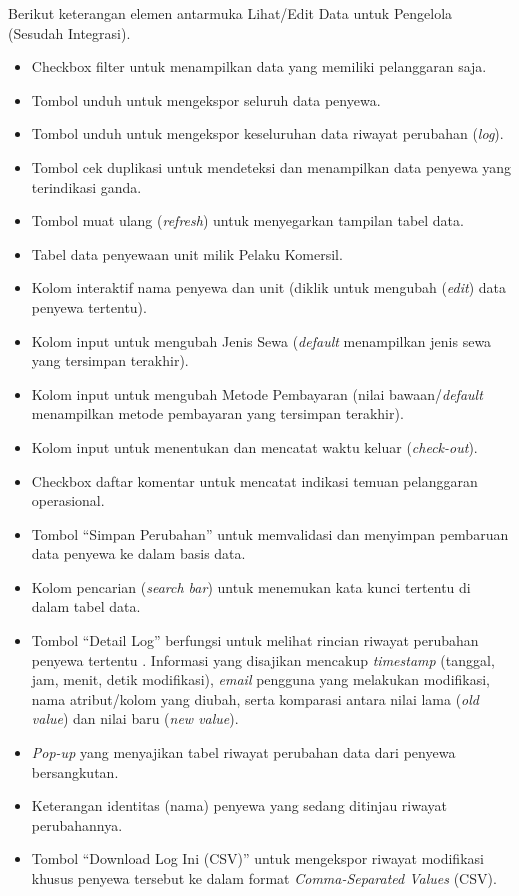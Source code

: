 \begin{itemize}
    Berikut keterangan elemen antarmuka Lihat/Edit Data untuk Pengelola (Sesudah Integrasi).
    \begin{itemize}
        \item[\textbf{A.}] {Checkbox} filter untuk menampilkan data yang memiliki pelanggaran saja.
        \item[\textbf{B.}] Tombol unduh untuk mengekspor seluruh data penyewa.
        \item[\textbf{C.}] Tombol unduh untuk mengekspor keseluruhan data riwayat perubahan (\textit{log}).
        \item[\textbf{D.}] Tombol cek duplikasi untuk mendeteksi dan menampilkan data penyewa yang terindikasi ganda.
        \item[\textbf{E.}] Tombol muat ulang (\textit{refresh}) untuk menyegarkan tampilan tabel data.
        \item[\textbf{F.}] Tabel data penyewaan unit milik Pelaku Komersil.
        \item[\textbf{G.}] Kolom interaktif nama penyewa dan unit (diklik untuk mengubah (\textit{edit}) data penyewa tertentu).
        \item[\textbf{H.}] Kolom {input} untuk mengubah Jenis Sewa (\textit{default} menampilkan jenis sewa yang tersimpan terakhir).
        \item[\textbf{I.}] Kolom {input} untuk mengubah Metode Pembayaran (nilai bawaan/\textit{default} menampilkan metode pembayaran yang tersimpan terakhir).
        \item[\textbf{J.}] Kolom {input} untuk menentukan dan mencatat waktu keluar (\textit{check-out}).
        \item[\textbf{K.}] {Checkbox} daftar komentar untuk mencatat indikasi temuan pelanggaran operasional.
        \item[\textbf{L.}] Tombol ``Simpan Perubahan'' untuk memvalidasi dan menyimpan pembaruan data penyewa ke dalam basis data.
        \item[\textbf{M.}] Kolom pencarian (\textit{search bar}) untuk menemukan kata kunci tertentu di dalam tabel data.
        \item[\textbf{N.}] Tombol ``Detail Log'' berfungsi untuk melihat rincian riwayat perubahan penyewa tertentu . Informasi yang disajikan mencakup \textit{timestamp} (tanggal, jam, menit, detik modifikasi), \textit{email} pengguna yang melakukan modifikasi, nama atribut/kolom yang diubah, serta komparasi antara nilai lama (\textit{old value}) dan nilai baru (\textit{new value}).
        \item[\textbf{O.}] \textit{Pop-up} yang menyajikan tabel riwayat perubahan data dari penyewa bersangkutan.
        \item[\textbf{P.}] Keterangan identitas (nama) penyewa yang sedang ditinjau riwayat perubahannya.
        \item[\textbf{Q.}] Tombol ``Download Log Ini (CSV)'' untuk mengekspor riwayat modifikasi khusus penyewa tersebut ke dalam format \textit{Comma-Separated Values} (CSV).
    \end{itemize}


\end{itemize}
